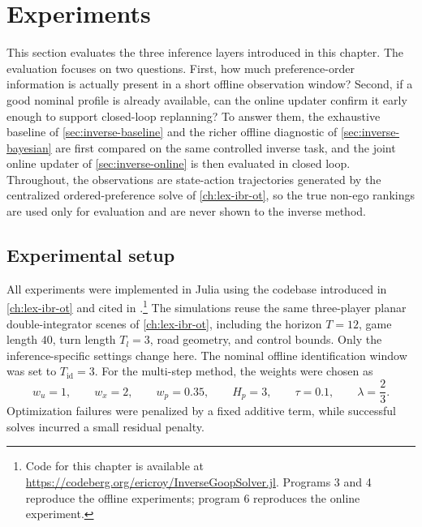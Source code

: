 \section{Experiments}
\label{sec:inverse-experiments}

This section evaluates the three inference layers introduced in this chapter.
The evaluation focuses on two questions.
First, how much preference-order information is actually present in a short offline observation window?
Second, if a good nominal profile is already available, can the online updater confirm it early enough to support
closed-loop replanning?
To answer them, the exhaustive baseline of \cref{sec:inverse-baseline} and the richer offline diagnostic of
\cref{sec:inverse-bayesian} are first compared on the same controlled inverse task, and the joint online updater of
\cref{sec:inverse-online} is then evaluated in closed loop.
Throughout, the observations are state-action trajectories generated by the centralized ordered-preference solve of
\cref{ch:lex-ibr-ot}, so the true non-ego rankings are used only for evaluation and are never shown to the inverse method.

\subsection{Experimental setup}

All experiments were implemented in Julia using the codebase introduced in \cref{ch:lex-ibr-ot} and cited in \cite{julia,code}.\footnote{Code for this chapter is available at \url{https://codeberg.org/ericroy/InverseGoopSolver.jl}. Programs 3 and 4 reproduce the offline experiments; program 6 reproduces the online experiment.}
The simulations reuse the same three-player planar double-integrator scenes of
\cref{ch:lex-ibr-ot}, including the horizon $T = 12$, game length $40$, turn length $T_l = 3$,
road geometry, and control bounds.
Only the inference-specific settings change here.
The nominal offline identification window was set to $T_{\mathrm{id}} = 3$.
For the multi-step method, the weights were chosen as
\[
w_u = 1,\qquad
w_x = 2,\qquad
w_p = 0.35,\qquad
H_p = 3,\qquad
\tau = 0.1,\qquad
\lambda = \frac{2}{3}.
\]
Optimization failures were penalized by a fixed additive term, while successful solves incurred a small
residual penalty.

